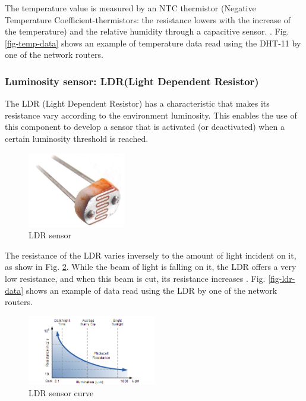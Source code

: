The temperature value is measured by an NTC thermistor (Negative Temperature Coefficient-thermistors: the resistance lowers with the increase of the temperature) and the relative humidity through a capacitive sensor. \cite{robotics2010dht11}. Fig. \ref{fig-temp-data} shows an example of temperature data read using the DHT-11 by one of the network routers.

\subsubsection{Luminosity sensor: LDR(Light Dependent Resistor)}

The LDR (Light Dependent Resistor) has a characteristic that makes its resistance vary according to the environment luminosity. This enables the use of this component to develop a sensor that is activated (or deactivated) when a certain luminosity threshold is reached.

\begin{figure}[!tb]
\centering
\includegraphics[width=0.38\textwidth]{figs/ldr}
\caption{LDR sensor}
\label{fig-ldr}
\end{figure}

The resistance of the LDR varies inversely to the amount of light incident on it, as show in Fig. \ref{fig-ldr-1}. While the beam of light is falling on it, the LDR offers a very low resistance, and when this beam is cut, its resistance increases \cite{ldr2010manual}. Fig. \ref{fig-ldr-data} shows an example of data read using the LDR by one of the network routers.

\begin{figure}[tb]
\centering
\includegraphics[width=0.5\textwidth]{figs/ldr-2}
\caption{LDR sensor curve}
\label{fig-ldr-1}
\end{figure}

